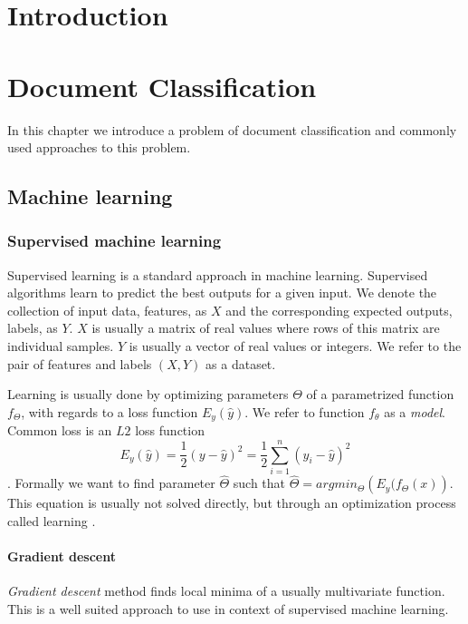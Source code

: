 \chapter*{Introduction}


\chapter{Document Classification}
    In this chapter we introduce a problem of document classification and commonly used approaches to this problem.
    
    \section{Machine learning}
        \subsection{Supervised machine learning}
        Supervised learning is a standard approach in machine learning. 
        Supervised algorithms learn to predict the best outputs for a given input.
        We denote the collection of input data, features, as $X$ and the corresponding expected outputs, labels, as $Y$.
        $X$ is usually a matrix of real values where rows of this matrix are individual samples.
        $Y$ is usually a vector of real values or integers. 
        We refer to the pair of features and labels $(X, Y)$ as a dataset.
        
        Learning is usually done by optimizing parameters $\Theta$ of a parametrized function $f_\Theta$,
        with regards to a loss function $E_y(\hat{y})$. 
        We refer to function $f_\theta$ as a \textit{model}.
        Common loss is an $L2$ loss function $$E_y(\hat{y}) = \frac{1}{2}(y - \hat{y})^2 = \frac{1}{2}\sum_{i=1}^n (y_i - \hat{y})^2$$.  
        Formally we want to find parameter $\hat{\Theta}$ such that $\hat{\Theta} = argmin_\Theta \left(E_y(f_\Theta(x) \right)$. 
        This equation is usually not solved directly, but through an optimization process called learning \cite{Goodfellow-et-al-2016}. %
        
        \subsubsection{Gradient descent}

        \textit{Gradient descent} method finds local minima of a usually multivariate function. 
        This is a well suited approach to use in context of supervised machine learning. 
        

